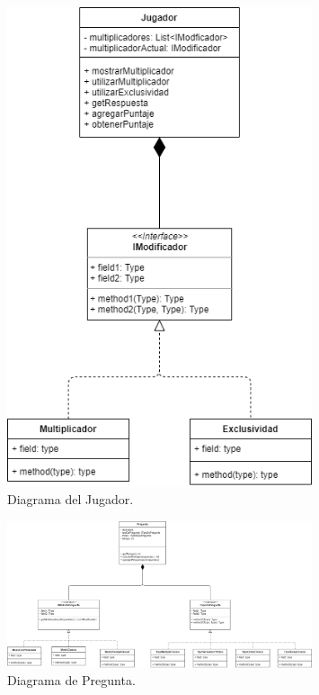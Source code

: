 \documentclass[titlepage,a4paper]{article}
\begin{document}
\begin{figure}[H]
    \centering
    \includegraphics[width=0.8\textwidth]{diagramaJugador.png}
    \caption{\label{fig:class02}Diagrama del Jugador.}
\end{figure}

\begin{figure}[H]
    \centering
    \includegraphics[width=0.8\textwidth]{diagramaPregunta.png}
    \caption{\label{fig:class03}Diagrama de Pregunta.}
\end{figure}
\end{document}

